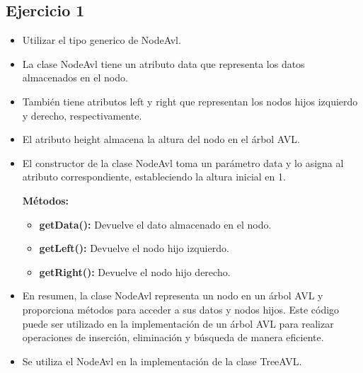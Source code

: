 \documentclass{article}
\begin{document}
	\subsection{Ejercicio 1}
	
	\begin{itemize}
		\item Utilizar el tipo generico de NodeAvl.
	\end{itemize}
	
	
	
	\begin{itemize}
		\item La clase NodeAvl tiene un atributo data que representa los datos almacenados en el nodo.
		\item También tiene atributos left y right que representan los nodos hijos izquierdo y derecho, respectivamente.
		\item El atributo height almacena la altura del nodo en el árbol AVL.
		\item El constructor de la clase NodeAvl toma un parámetro data y lo asigna al atributo correspondiente, estableciendo la altura inicial en 1.
		
		\textbf{Métodos:}

		\begin{itemize}
			\item \textbf{getData():} Devuelve el dato almacenado en el nodo.
			\item \textbf{getLeft():} Devuelve el nodo hijo izquierdo.
			\item \textbf{getRight():} Devuelve el nodo hijo derecho.
		\end{itemize}
		
		\item En resumen, la clase NodeAvl representa un nodo en un árbol AVL y proporciona métodos para acceder a sus datos y nodos hijos. Este código puede ser utilizado en la implementación de un árbol AVL para realizar operaciones de inserción, eliminación y búsqueda de manera eficiente.
	\end{itemize}
	
	\begin{itemize}
		\item Se utiliza el NodeAvl en la implementación de la clase TreeAVL.
	\end{itemize}

	
	
\end{document}
